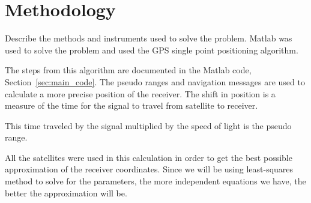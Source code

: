 \section{Methodology} 

\label{sec:methodology}

Describe the methods and instruments used to solve the problem. Matlab was used to solve the problem and used the GPS single point positioning algorithm.\cite{milanGPS} 

\noindent The steps from this algorithm are documented in the Matlab code, Section~\ref{sec:main_code}. The pseudo ranges and navigation messages are used to calculate a more precise position of the receiver.  The shift in position is a measure of the time for the signal to travel from satellite to receiver. 

This time traveled by the signal multiplied by the speed of light is the pseudo range.  

All the satellites were used in this calculation in order to get the best possible approximation of the receiver coordinates.  Since we will be using least-squares method to solve for the parameters, the more independent equations we have, the better the approximation will be.   



